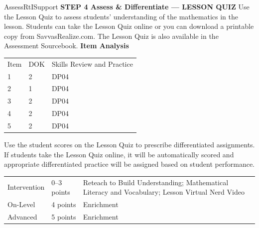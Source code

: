 \documentclass{article}
\newenvironment{te-addendum}[2]{}{}     %
\begin{document}
\begin{te-addendum}{Assess}{RtISupport}
\textbf{STEP 4 Assess & Differentiate — LESSON QUIZ}
Use the Lesson Quiz to assess students' understanding of the mathematics in the lesson.
Students can take the Lesson Quiz online or you can download a printable copy from SavvasRealize.com. The Lesson Quiz is also available in the Assessment Sourcebook.
\textbf{Item Analysis}
\begin{tabular}{lll}
Item & DOK & Skills Review and Practice \\
1 & 2 & DP04 \\
2 & 1 & DP04 \\
3 & 2 & DP04 \\
4 & 2 & DP04 \\
5 & 2 & DP04 \\
\end{tabular}
Use the student scores on the Lesson Quiz to prescribe differentiated assignments.
If students take the Lesson Quiz online, it will be automatically scored and appropriate differentiated practice will be assigned based on student performance.
\begin{tabular}{lll}
Intervention & 0--3 points & Reteach to Build Understanding; Mathematical Literacy and Vocabulary; Lesson Virtual Nerd Video \\
On-Level & 4 points & Enrichment \\
Advanced & 5 points & Enrichment \\
\end{tabular}
\end{te-addendum}
\end{document}

